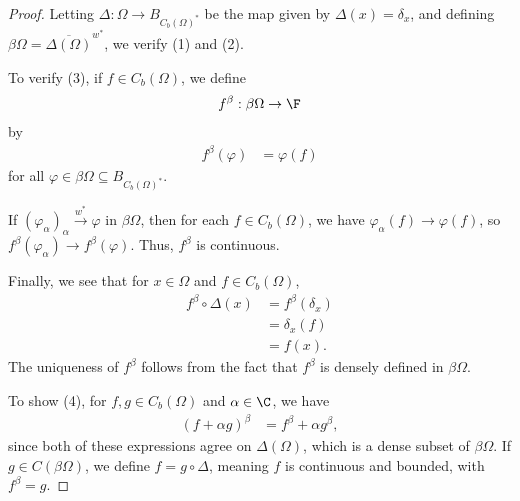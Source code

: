 \documentclass[10pt]{mypackage}
\begin{document}
\begin{proof}
  Letting $\Delta: \Omega\rightarrow B_{C_b\left(\Omega\right)^{\ast}}$ be the map given by $\Delta(x) = \delta_{x}$, and defining $\beta\Omega = \overline{\Delta\left(\Omega\right)}^{w^{\ast}}$, we verify (1) and (2).\newline

  To verify (3), if $f\in C_b\left(\Omega\right)$, we define
  \begin{align*}
    f^{\beta}:\beta\Omega\rightarrow \F
  \end{align*}
  by
  \begin{align*}
    f^{\beta}\left(\varphi\right) &= \varphi\left(f\right)
  \end{align*}
  for all $\varphi\in \beta\Omega\subseteq B_{C_b\left(\Omega\right)^{\ast}}$.\newline

  If $\left(\varphi_{\alpha}\right)_{\alpha}\xrightarrow{w^{\ast}}\varphi$ in $\beta\Omega$, then for each $f\in C_b\left(\Omega\right)$, we have $\varphi_{\alpha}\left(f\right) \rightarrow \varphi\left(f\right)$, so $f^{\beta}\left(\varphi_{\alpha}\right)\rightarrow f^{\beta}\left(\varphi\right)$. Thus, $f^{\beta}$ is continuous.\newline

  Finally, we see that for $x\in \Omega$ and $f\in C_b\left(\Omega\right)$,
  \begin{align*}
    f^{\beta}\circ \Delta\left(x\right) &= f^{\beta}\left(\delta_{x}\right)\\
                                        &= \delta_{x}\left(f\right)\\
                                        &= f(x).
  \end{align*}
  The uniqueness of $f^{\beta}$ follows from the fact that $f^{\beta}$ is densely defined in $\beta\Omega$.\newline

  To show (4), for $f,g\in C_{b}\left(\Omega\right)$ and $\alpha\in \C$, we have
  \begin{align*}
    \left(f + \alpha g\right)^{\beta} &= f^{\beta} + \alpha g^{\beta},
  \end{align*}
  since both of these expressions agree on $\Delta\left(\Omega\right)$, which is a dense subset of $\beta\Omega$. If $g\in C\left(\beta\Omega\right)$, we define $f = g\circ\Delta$, meaning $f$ is continuous and bounded, with $f^{\beta} = g$.\newline


\end{proof}
\end{document}
